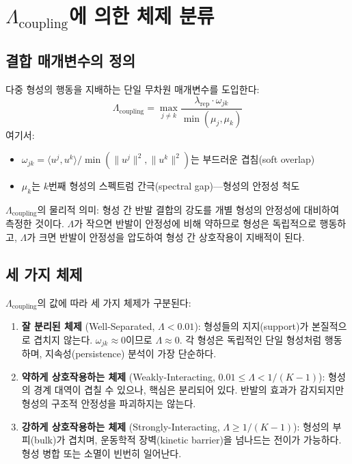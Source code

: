 \section{$\Lambda_{\mathrm{coupling}}$에 의한 체제 분류}
\label{sec:regime-classification}

\subsection{결합 매개변수의 정의}

다중 형성의 행동을 지배하는 단일 무차원 매개변수를 도입한다:
\begin{equation}
    \Lambda_{\mathrm{coupling}} = \max_{j \neq k} \frac{\lambda_{\mathrm{rep}} \cdot \omega_{jk}}{\min(\mu_j, \mu_k)}
    \label{eq:lambda-coupling}
\end{equation}
여기서:
\begin{itemize}
    \item $\omega_{jk} = \langle u^j, u^k \rangle / \min(\|u^j\|^2, \|u^k\|^2)$는 부드러운 겹침(soft overlap)
    \item $\mu_k$는 $k$번째 형성의 스펙트럼 간극(spectral gap)---형성의 안정성 척도
\end{itemize}

$\Lambda_{\mathrm{coupling}}$의 물리적 의미: 형성 간 반발 결합의 강도를 개별 형성의 안정성에 대비하여 측정한 것이다. $\Lambda$가 작으면 반발이 안정성에 비해 약하므로 형성은 독립적으로 행동하고, $\Lambda$가 크면 반발이 안정성을 압도하여 형성 간 상호작용이 지배적이 된다.

\subsection{세 가지 체제}

$\Lambda_{\mathrm{coupling}}$의 값에 따라 세 가지 체제가 구분된다:

\begin{enumerate}
    \item \textbf{잘 분리된 체제} (Well-Separated, $\Lambda < 0.01$): 형성들의 지지(support)가 본질적으로 겹치지 않는다. $\omega_{jk} \approx 0$이므로 $\Lambda \approx 0$. 각 형성은 독립적인 단일 형성처럼 행동하며, 지속성(persistence) 분석이 가장 단순하다.

    \item \textbf{약하게 상호작용하는 체제} (Weakly-Interacting, $0.01 \leq \Lambda < 1/(K-1)$): 형성의 경계 대역이 겹칠 수 있으나, 핵심은 분리되어 있다. 반발의 효과가 감지되지만 형성의 구조적 안정성을 파괴하지는 않는다.

    \item \textbf{강하게 상호작용하는 체제} (Strongly-Interacting, $\Lambda \geq 1/(K-1)$): 형성의 부피(bulk)가 겹치며, 운동학적 장벽(kinetic barrier)을 넘나드는 전이가 가능하다. 형성 병합 또는 소멸이 빈번히 일어난다.
\end{enumerate}

